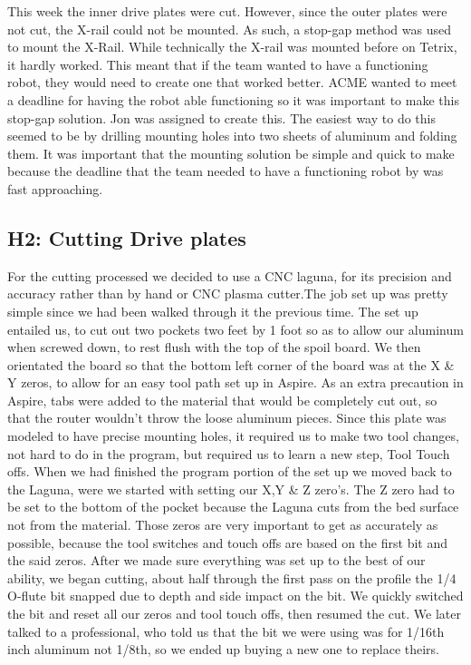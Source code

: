 \documentclass{article}
\begin{document}
This week the inner drive plates were cut. However, since the outer plates were not cut, the X-rail could not be mounted. As such, a stop-gap method was used to mount the X-Rail. While technically the X-rail was mounted before on Tetrix, it hardly worked. This meant that if the team wanted to have a functioning robot, they would need to create one that worked better. ACME wanted to meet a deadline for having the robot able functioning so it was important to make this stop-gap solution. Jon was assigned to create this. The easiest way to do this seemed to be by drilling mounting holes into two sheets of aluminum and folding them. It was important that the mounting solution be simple and quick to make because the deadline that the team needed to have a functioning robot by was fast approaching. 

\subsection{H2: Cutting Drive plates}

For the cutting processed we decided to use a CNC laguna, for its precision and accuracy rather than by hand or CNC plasma cutter.The job set up was pretty simple since we had been walked through it the previous time. The set up entailed us, to cut out two pockets two feet by 1 foot so as to allow our aluminum when screwed down, to rest flush with the top of the spoil board. We then orientated the board so that the bottom left corner of the board was at the X \& Y zeros, to allow for an easy tool path set up in Aspire. As an extra precaution in Aspire, tabs were added to the material that would be completely cut out, so that the router wouldn't throw the loose aluminum pieces. Since this plate was modeled to have precise mounting holes, it required us to make two tool changes, not hard to do in the program, but required us to learn a new step, Tool Touch offs. When we had finished the program portion of the set up we moved back to the Laguna, were we started with setting our X,Y \& Z zero's. The Z zero had to be set to the bottom of the pocket because the Laguna cuts from the bed surface not from the material. Those zeros are very important to get as accurately as possible, because the tool switches and touch offs are based on the first bit and the said zeros. After we made sure everything was set up to the best of our ability, we began cutting, about half through the first pass on the profile the 1/4 O-flute bit snapped due to depth and side impact on the bit. We quickly switched the bit and reset all our zeros and tool touch offs, then resumed the cut. We later talked to a professional, who told us that the bit we were using was for 1/16th inch aluminum not 1/8th, so we ended up buying a new one to replace theirs.  
\end{document}
